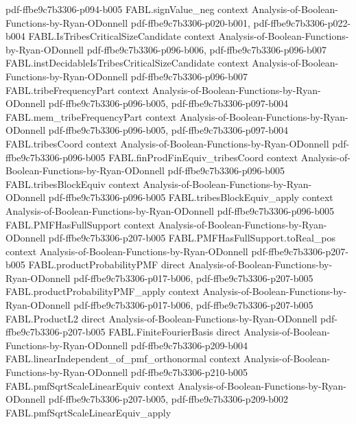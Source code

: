 \begin{theorem}
{    pdf-ffbe9c7b3306-p094-b005}
\proofstep
  {FABL.signValue_neg}
  {context}
  {Analysis-of-Boolean-Functions-by-Ryan-ODonnell}
  {pdf-ffbe9c7b3306-p020-b001,
    pdf-ffbe9c7b3306-p022-b004}
\proofstep
  {FABL.IsTribesCriticalSizeCandidate}
  {context}
  {Analysis-of-Boolean-Functions-by-Ryan-ODonnell}
  {pdf-ffbe9c7b3306-p096-b006,
    pdf-ffbe9c7b3306-p096-b007}
\proofstep
  {FABL.instDecidableIsTribesCriticalSizeCandidate}
  {context}
  {Analysis-of-Boolean-Functions-by-Ryan-ODonnell}
  {pdf-ffbe9c7b3306-p096-b007}
\proofstep
  {FABL.tribeFrequencyPart}
  {context}
  {Analysis-of-Boolean-Functions-by-Ryan-ODonnell}
  {pdf-ffbe9c7b3306-p096-b005,
    pdf-ffbe9c7b3306-p097-b004}
\proofstep
  {FABL.mem_tribeFrequencyPart}
  {context}
  {Analysis-of-Boolean-Functions-by-Ryan-ODonnell}
  {pdf-ffbe9c7b3306-p096-b005,
    pdf-ffbe9c7b3306-p097-b004}
\proofstep
  {FABL.tribesCoord}
  {context}
  {Analysis-of-Boolean-Functions-by-Ryan-ODonnell}
  {pdf-ffbe9c7b3306-p096-b005}
\proofstep
  {FABL.finProdFinEquiv_tribesCoord}
  {context}
  {Analysis-of-Boolean-Functions-by-Ryan-ODonnell}
  {pdf-ffbe9c7b3306-p096-b005}
\proofstep
  {FABL.tribesBlockEquiv}
  {context}
  {Analysis-of-Boolean-Functions-by-Ryan-ODonnell}
  {pdf-ffbe9c7b3306-p096-b005}
\proofstep
  {FABL.tribesBlockEquiv_apply}
  {context}
  {Analysis-of-Boolean-Functions-by-Ryan-ODonnell}
  {pdf-ffbe9c7b3306-p096-b005}
\proofstep
  {FABL.PMFHasFullSupport}
  {context}
  {Analysis-of-Boolean-Functions-by-Ryan-ODonnell}
  {pdf-ffbe9c7b3306-p207-b005}
\proofstep
  {FABL.PMFHasFullSupport.toReal_pos}
  {context}
  {Analysis-of-Boolean-Functions-by-Ryan-ODonnell}
  {pdf-ffbe9c7b3306-p207-b005}
\proofstep
  {FABL.productProbabilityPMF}
  {direct}
  {Analysis-of-Boolean-Functions-by-Ryan-ODonnell}
  {pdf-ffbe9c7b3306-p017-b006,
    pdf-ffbe9c7b3306-p207-b005}
\proofstep
  {FABL.productProbabilityPMF_apply}
  {context}
  {Analysis-of-Boolean-Functions-by-Ryan-ODonnell}
  {pdf-ffbe9c7b3306-p017-b006,
    pdf-ffbe9c7b3306-p207-b005}
\proofstep
  {FABL.ProductL2}
  {direct}
  {Analysis-of-Boolean-Functions-by-Ryan-ODonnell}
  {pdf-ffbe9c7b3306-p207-b005}
\proofstep
  {FABL.FiniteFourierBasis}
  {direct}
  {Analysis-of-Boolean-Functions-by-Ryan-ODonnell}
  {pdf-ffbe9c7b3306-p209-b004}
\proofstep
  {FABL.linearIndependent_of_pmf_orthonormal}
  {context}
  {Analysis-of-Boolean-Functions-by-Ryan-ODonnell}
  {pdf-ffbe9c7b3306-p210-b005}
\proofstep
  {FABL.pmfSqrtScaleLinearEquiv}
  {context}
  {Analysis-of-Boolean-Functions-by-Ryan-ODonnell}
  {pdf-ffbe9c7b3306-p207-b005,
    pdf-ffbe9c7b3306-p209-b002}
\proofstep
  {FABL.pmfSqrtScaleLinearEquiv_apply}

\end{theorem}

